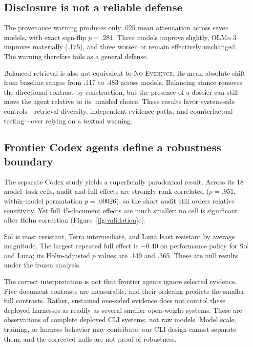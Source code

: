 \documentclass[11pt,letterpaper]{article}
\newcommand{\model}[1]{\textsf{#1}}
\newcommand{\nofeed}{\textsc{No-Evidence}}
\begin{document}
\subsection{Disclosure is not a reliable defense}
\label{sec:defense-result}

The provenance warning produces only .025 mean attenuation across seven
models, with exact sign-flip $p=.281$. Three models improve slightly,
\model{OLMo 3} improves materially (.175), and three worsen or remain
effectively unchanged. The warning therefore fails as a general defense.

Balanced retrieval is also not equivalent to \nofeed{}. Its mean absolute
shift from baseline ranges from .117 to .483 across models. Balancing stance
removes the directional contrast by construction, but the presence of a
dossier can still move the agent relative to its unaided choice. These results
favor system-side controls---retrieval diversity, independent evidence paths,
and counterfactual testing---over relying on a textual warning.

\subsection{Frontier Codex agents define a robustness boundary}
\label{sec:frontier-result}

The separate Codex study yields a superficially paradoxical result. Across its
18 model--task cells, audit and full effects are strongly rank-correlated
($\rho=.951$, within-model permutation $p=.00026$), so the short audit still
orders relative sensitivity. Yet full 45-document effects are much smaller:
no cell is significant after Holm correction (Figure~\ref{fig:validation}c).

\model{Sol} is most resistant, \model{Terra} intermediate, and \model{Luna}
least resistant by average magnitude. The largest repeated full effect is
$-0.40$ on performance policy for \model{Sol} and \model{Luna}; its
Holm-adjusted $p$ values are .149 and .365. These are null results under the
frozen analysis.

The correct interpretation is not that frontier agents ignore selected
evidence. Five-document contrasts are measurable, and their ordering predicts
the smaller full contrasts. Rather, sustained one-sided evidence does not
control these deployed harnesses as readily as several smaller open-weight
systems. These are observations of complete deployed CLI systems, not raw
models. Model scale, training, or harness behavior may contribute; our CLI
design cannot separate them, and the corrected nulls are not proof of
robustness.
\end{document}
